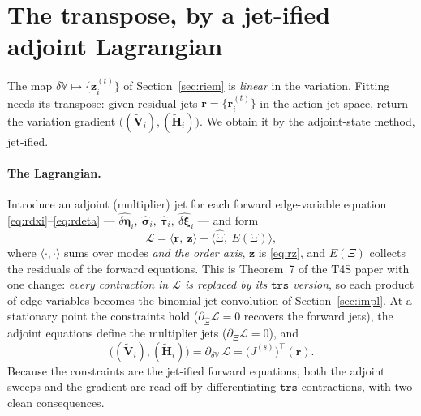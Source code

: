 \documentclass[11pt]{article}
\theoremstyle{definition}
\theoremstyle{plain}
\begin{document}
\section{The transpose, by a jet-ified adjoint Lagrangian}
\label{sec:transpose}

The map $\delta\mathbb V \mapsto \{\mathbf z_i^{(t)}\}$ of Section~\ref{sec:riem} is \emph{linear} in
the variation. Fitting needs its transpose: given residual jets $\mathbf r = \{\mathbf r_i^{(t)}\}$ in
the action-jet space, return the variation gradient $\big((\widetilde{\mathbf V}_i),
(\widetilde{\mathbf H}_i)\big)$. We obtain it by the adjoint-state method, jet-ified.

\paragraph{The Lagrangian.}
Introduce an adjoint (multiplier) jet for each forward edge-variable equation
\eqref{eq:rdxi}--\eqref{eq:rdeta} --- $\widehat{\delta\boldsymbol\eta}_i,\ \widehat{\boldsymbol\sigma}_i,\
\widehat{\boldsymbol\tau}_i,\ \widehat{\delta\boldsymbol\xi}_i$ --- and form
\begin{equation}
  \label{eq:lagr}
  \mathcal L = \big\langle \mathbf r,\ \mathbf z \big\rangle
    + \big\langle \widehat\Xi,\ E(\Xi) \big\rangle,
\end{equation}
where $\langle\cdot,\cdot\rangle$ sums over modes \emph{and the order axis}, $\mathbf z$ is
\eqref{eq:rz}, and $E(\Xi)$ collects the residuals of the forward equations. This is Theorem~7 of the
T4S paper with one change: \emph{every contraction in $\mathcal L$ is replaced by its $\texttt{trs}$
version}, so each product of edge variables becomes the binomial jet convolution of
Section~\ref{sec:impl}. At a stationary point the constraints hold ($\partial_{\widehat\Xi}\mathcal L
= 0$ recovers the forward jets), the adjoint equations define the multiplier jets
($\partial_\Xi\mathcal L = 0$), and
\begin{equation}
  \label{eq:grad}
  \big((\widetilde{\mathbf V}_i),(\widetilde{\mathbf H}_i)\big)
  = \partial_{\delta\mathbb V}\, \mathcal L = \big(J^{(s)}\big)^\top(\mathbf r).
\end{equation}
Because the constraints are the jet-ified forward equations, both the adjoint sweeps and the gradient
are read off by differentiating $\texttt{trs}$ contractions, with two clean consequences.
\end{document}
